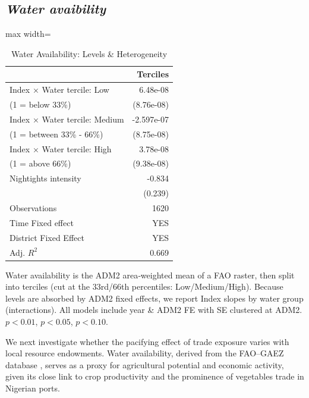 \subsection{\textit{Water avaibility}}
\begin{table}[htbp]\centering
	\caption{Water Availability: Levels \& Heterogeneity}
	\label{tab:water}
	\begin{adjustbox}{max width=\textwidth}
		\begin{tabular}{lr}
			\toprule
			& Terciles \\
			\midrule
			Index × Water tercile: Low & 6.48e-08 \\
			(1 = below 33\%) & (8.76e-08)  \\
			Index × Water tercile: Medium & -2.597e-07\sym{**} \\
			(1 = between 33\% - 66\%)&  (8.75e-08) \\
			Index × Water tercile: High & 3.78e-08 \\
			(1 = above 66\%) &  (9.38e-08) \\
			Nightights intensity & -0.834\sym{***} \\
			& (0.239) \\
			\midrule
			Observations  & 1620 \\
			Time Fixed effect & YES\\
			District Fixed Effect & YES\\
			Adj. $R^2$  & 0.669 \\
			\bottomrule
		\end{tabular}
	\end{adjustbox}
	\begin{flushleft}\footnotesize
		Water availability is the ADM2 area‐weighted mean of a FAO raster, then split into terciles (cut at the 33rd/66th percentiles: Low/Medium/High). Because levels are absorbed by ADM2 fixed effects, we report Index slopes by water group (interactions). All models include year \& ADM2 FE with SE clustered at ADM2. 
		\sym{***} $p<0.01$, \sym{**} $p<0.05$, \sym{*} $p<0.10$.
	\end{flushleft}
\end{table}


We next investigate whether the pacifying effect of trade exposure varies with local resource endowments. Water availability, derived from the FAO–GAEZ database \parencite{FAO_GAEZ_2020_dataset}, serves as a proxy for agricultural potential and economic activity, given its close link to crop productivity and the prominence of vegetables trade in Nigerian ports.\\

